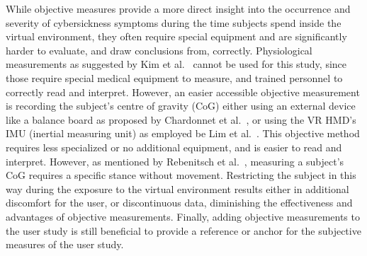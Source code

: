 While objective measures provide a more direct insight into the occurrence and severity of cybersickness symptoms
during the time subjects spend inside the virtual environment, they often  require special equipment and are
significantly harder to evaluate, and draw conclusions from, correctly.
Physiological measurements as suggested by Kim et al.~\cite{Kim2005} cannot be used for this study, since those
require special medical equipment to measure, and trained personnel to correctly read and interpret.
However, an easier accessible objective measurement is recording the subject's centre of gravity (CoG) either using an
external device like a balance board as proposed by Chardonnet et al.~\cite{Chardonnet2015}, or using the VR HMD's
IMU (inertial measuring unit) as employed be Lim et al.~\cite{Lim2020}.
This objective method requires less specialized or no additional equipment, and is easier to read and interpret.
However, as mentioned by Rebenitsch et al.~\cite{Rebenitsch2016}, measuring a subject's CoG requires a specific
stance without movement.
Restricting the subject in this way during the exposure to the virtual environment results either in additional
discomfort for the user, or discontinuous data, diminishing the effectiveness and advantages of objective measurements.
Finally, adding objective measurements to the user study is still beneficial to provide a reference or anchor for the
subjective measures of the user study.

